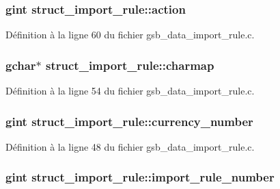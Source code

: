 \subsubsection[{action}]{\setlength{\rightskip}{0pt plus 5cm}gint {\bf struct\_\-import\_\-rule::action}}\label{structstruct__import__rule_a05f967daba2e2d18055562acf29fb158}


Définition à la ligne 60 du fichier gsb\_\-data\_\-import\_\-rule.c.

\subsubsection[{charmap}]{\setlength{\rightskip}{0pt plus 5cm}gchar$\ast$ {\bf struct\_\-import\_\-rule::charmap}}\label{structstruct__import__rule_a436a3e34c8dab4cc77421e659f9e9ceb}


Définition à la ligne 54 du fichier gsb\_\-data\_\-import\_\-rule.c.

\subsubsection[{currency\_\-number}]{\setlength{\rightskip}{0pt plus 5cm}gint {\bf struct\_\-import\_\-rule::currency\_\-number}}\label{structstruct__import__rule_a00fd462231b97787f9f5f52c24780f95}


Définition à la ligne 48 du fichier gsb\_\-data\_\-import\_\-rule.c.

\subsubsection[{import\_\-rule\_\-number}]{\setlength{\rightskip}{0pt plus 5cm}gint {\bf struct\_\-import\_\-rule::import\_\-rule\_\-number}}\label{structstruct__import__rule_a4792195b71746858eb1dcef9e8d4b369}


